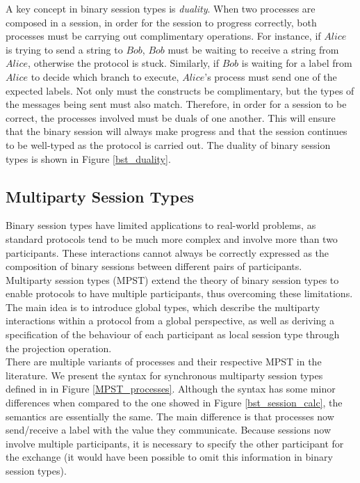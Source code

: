 \documentclass[12pt,twoside]{report}
\begin{document}
A key concept in binary session types is \textit{duality}. When two processes are composed in a session, in order for the session to progress correctly, both processes must be carrying out complimentary operations. For instance, if $\textit{Alice}$ is trying to send a string to $\textit{Bob}$, $\textit{Bob}$ must be waiting to receive a string from $\textit{Alice}$, otherwise the protocol is stuck. Similarly, if $\textit{Bob}$ is waiting for a label from $\textit{Alice}$ to decide which branch to execute, $\textit{Alice}$'s process must send one of the expected labels. Not only must the constructs be complimentary, but the types of the messages being sent must also match. Therefore, in order for a session to be correct, the processes involved must be duals of one another. This will ensure that the binary session will always make progress and that the session continues to be well-typed as the protocol is carried out. The duality of binary session types is shown in Figure \ref{bst_duality}.



\subsection{Multiparty Session Types}\label{multiparty-session-types}
Binary session types have limited applications to real-world problems, as standard protocols tend to be much more complex and involve more than two participants. These interactions cannot always be correctly expressed as the composition of binary sessions between different pairs of participants. \\

Multiparty session types\cite{asyncmpst2} (MPST) extend the theory of binary session types to enable protocols to have multiple participants, thus overcoming these limitations. The main idea is to introduce global types, which describe the multiparty interactions within a protocol from a global perspective, as well as deriving a specification of the behaviour of each participant as local session type through the projection operation. \\

There are multiple variants of processes and their respective MPST in the literature. We present the syntax for synchronous multiparty session types defined in \cite{verygentleintrotompst} in Figure \ref{MPST_processes}. Although the syntax has some minor differences when compared to the one showed in Figure \ref{bst_session_calc}, the semantics are essentially the same. The main difference is that processes now send/receive a label with the value they communicate. Because sessions now involve multiple participants, it is necessary to specify the other participant for the exchange (it would have been possible to omit this information in binary session types). \\
\end{document}

